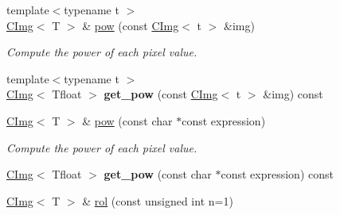 \begin{DoxyCompactItemize}
\item 
\hypertarget{structcimg__library_1_1CImg_af80272ba663ef935914c34d24171abb8}{
{\footnotesize template$<$typename t $>$ }\\\hyperlink{structcimg__library_1_1CImg}{CImg}$<$ T $>$ \& \hyperlink{structcimg__library_1_1CImg_af80272ba663ef935914c34d24171abb8}{pow} (const \hyperlink{structcimg__library_1_1CImg}{CImg}$<$ t $>$ \&img)}
\label{structcimg__library_1_1CImg_af80272ba663ef935914c34d24171abb8}

\begin{DoxyCompactList}\small\item\em Compute the power of each pixel value. \item\end{DoxyCompactList}\item 
\hypertarget{structcimg__library_1_1CImg_a6fd928c435c48e5d9ee019aa7e1ba37f}{
{\footnotesize template$<$typename t $>$ }\\\hyperlink{structcimg__library_1_1CImg}{CImg}$<$ Tfloat $>$ {\bfseries get\_\-pow} (const \hyperlink{structcimg__library_1_1CImg}{CImg}$<$ t $>$ \&img) const }
\label{structcimg__library_1_1CImg_a6fd928c435c48e5d9ee019aa7e1ba37f}

\item 
\hypertarget{structcimg__library_1_1CImg_ad63450db50c6f5d7e151f8ffe129ff92}{
\hyperlink{structcimg__library_1_1CImg}{CImg}$<$ T $>$ \& \hyperlink{structcimg__library_1_1CImg_ad63450db50c6f5d7e151f8ffe129ff92}{pow} (const char $\ast$const expression)}
\label{structcimg__library_1_1CImg_ad63450db50c6f5d7e151f8ffe129ff92}

\begin{DoxyCompactList}\small\item\em Compute the power of each pixel value. \item\end{DoxyCompactList}\item 
\hypertarget{structcimg__library_1_1CImg_a2aef419803fd9725aeed72e5abadc610}{
\hyperlink{structcimg__library_1_1CImg}{CImg}$<$ Tfloat $>$ {\bfseries get\_\-pow} (const char $\ast$const expression) const }
\label{structcimg__library_1_1CImg_a2aef419803fd9725aeed72e5abadc610}

\item 
\hypertarget{structcimg__library_1_1CImg_a6979cc38e9b1bc2dd719f21a6a9e1b07}{
\hyperlink{structcimg__library_1_1CImg}{CImg}$<$ T $>$ \& \hyperlink{structcimg__library_1_1CImg_a6979cc38e9b1bc2dd719f21a6a9e1b07}{rol} (const unsigned int n=1)}
\label{structcimg__library_1_1CImg_a6979cc38e9b1bc2dd719f21a6a9e1b07}


\end{DoxyCompactItemize}
